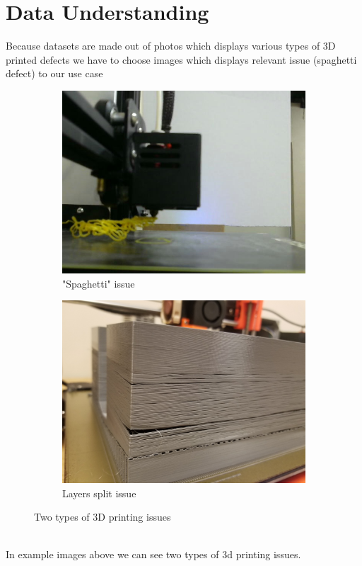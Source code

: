 \documentclass[12pt,a4paper]{article}
\begin{document}
\section{Data Understanding}
Because datasets are made out of photos which displays various types of 3D printed defects we have to choose images which displays relevant issue (spaghetti defect) to our use case
\begin{figure}[h]
    \centering
    \begin{subfigure}[b]{0.45\textwidth}
        \centering
        \includegraphics[width=\textwidth]{no_support_0.jpg}
        \caption{"Spaghetti" issue\cite{onlineOpenSource1}}
        \label{fig:image1}
    \end{subfigure}
    \begin{subfigure}[b]{0.45\textwidth}
        \centering
        \includegraphics[width=\textwidth]{24382-129778-20190220-061954.jpg}
        \caption{Layers split issue\cite{onlineOpenSource2}}
        \label{fig:image2}
    \end{subfigure}
    \hfill

    \caption{Two types of 3D printing issues}
    \label{fig:test}
\end{figure}
\\In example images above we can see two types of 3d printing issues.
\end{document}
